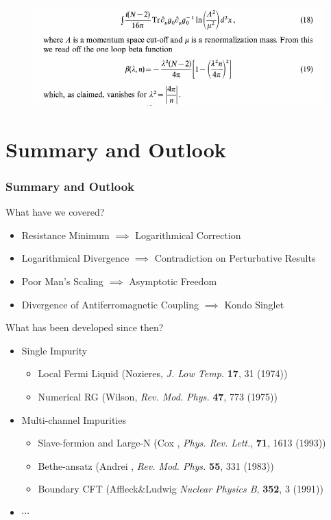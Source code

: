 \documentclass[10pt,aspectratio=43,xcolor=x11names]{beamer}%
\begin{document}
\begin{frame}
\begin{itemize}
{				\begin{figure}[!htp]
					\centering
					\includegraphics[scale=0.8]{WZW.pdf}
				\end{figure}}
			\end{itemize}
		\end{frame}

\section{Summary and Outlook}
	\begin{frame}\frametitle{Summary and Outlook}
		What have we covered?
		\begin{itemize}
			\item Resistance Minimum $\implies$ Logarithmical Correction
			\item Logarithmical Divergence $\implies$ Contradiction on Perturbative Results
			\item Poor Man's Scaling $\implies$ Asymptotic Freedom
			\item Divergence of Antiferromagnetic Coupling $\implies$ Kondo Singlet
		\end{itemize}
		\pause
		What has been developed since then?
		\begin{itemize}
			\item Single Impurity
			\begin{itemize}
				\item Local Fermi Liquid (Nozieres, \textit{J. Low Temp.} \textbf{17}, 31 (1974))
				\item Numerical RG (Wilson, \textit{Rev. Mod. Phys.} \textbf{47}, 773 (1975))
			\end{itemize}
			\item Multi-channel Impurities
			\begin{itemize}
				\item Slave-fermion and Large-N (Cox , \textit{Phys. Rev. Lett.}, \textbf{71}, 1613 (1993))
				\item Bethe-ansatz (Andrei , \textit{Rev. Mod. Phys.} \textbf{55}, 331 (1983))
				\item Boundary CFT (Affleck\&Ludwig \textit{Nuclear Physics B}, \textbf{352}, 3 (1991))
			\end{itemize}
			\item $\cdots$
		\end{itemize}
	\end{frame}
	
\end{document}
